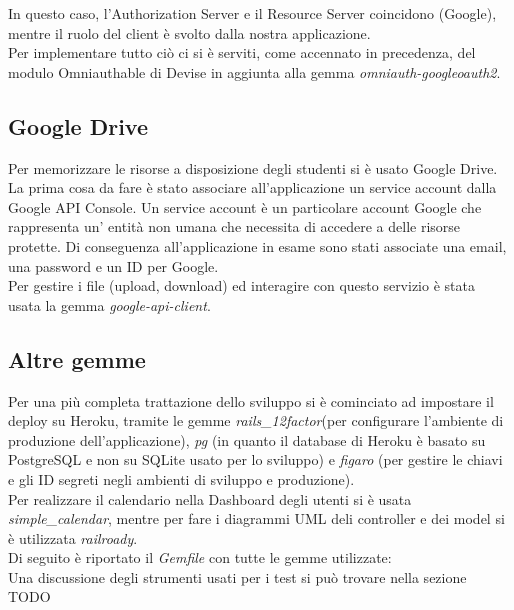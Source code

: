 \documentclass[Lau, binding=0.6cm, oneside]{sapthesis}
\begin{document}
In questo caso, l’Authorization Server e il Resource Server coincidono (Google), mentre il ruolo del client è svolto dalla nostra applicazione.\\
Per implementare tutto ciò ci si è serviti, come accennato in precedenza, del modulo Omniauthable di Devise in aggiunta alla gemma \textit{omniauth-googleoauth2}.

\subsection{Google Drive}

Per memorizzare le risorse a disposizione degli studenti si è usato Google Drive.\\
La prima cosa da fare è stato associare all'applicazione un service account dalla Google API Console. Un service account è un particolare account Google che rappresenta un' entità non umana che necessita di accedere a delle risorse protette. Di conseguenza all'applicazione in esame sono stati associate una email, una password e un ID per Google.\\
Per gestire i file (upload, download) ed interagire con questo servizio è stata usata la gemma \textit{google-api-client}.

\subsection{Altre gemme}

Per una più completa trattazione dello sviluppo si è cominciato ad impostare il deploy su Heroku, tramite le gemme \textit{rails\_12factor}(per configurare l'ambiente di produzione dell'applicazione), \textit{pg} (in quanto il database di Heroku è basato su PostgreSQL e non su SQLite usato per lo sviluppo) e \textit{figaro} (per gestire le chiavi e gli ID segreti negli ambienti di sviluppo e produzione).\\
Per realizzare il calendario nella Dashboard degli utenti si è usata \textit{simple\_calendar}, mentre per fare i diagrammi UML deli controller e dei model si è utilizzata \textit{railroady}.\\
Di seguito è riportato il \textit{Gemfile} con tutte le gemme utilizzate:\\



Una discussione degli strumenti usati per i test si può trovare nella sezione TODO\\
\end{document}
